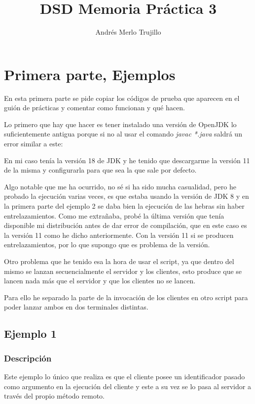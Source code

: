 \documentclass{article}
\title{DSD Memoria Práctica 3}
\author{Andrés Merlo Trujillo}
\date{}
\begin{document}

\maketitle

\section{Primera parte, Ejemplos}
En esta primera parte se pide copiar los códigos de prueba que aparecen en el guión de prácticas y comentar como funcionan y qué hacen.

Lo primero que hay que hacer es tener instalado una versión de OpenJDK lo suficientemente antigua porque si no al usar el comando \textit{javac *.java} saldrá un error similar a este:


En mi caso tenía la versión 18 de JDK y he tenido que descargarme la versión 11 de la misma y configurarla para que sea la que sale por defecto.

Algo notable que me ha ocurrido, no sé si ha sido mucha casualidad, pero he probado la ejecución varias veces, es que estaba usando la versión de JDK 8 y en la primera parte del ejemplo 2 se daba bien la ejecución de las hebras sin haber entrelazamientos. Como me extrañaba, probé la última versión que tenía disponible mi distribución antes de dar error de compilación, que en este caso es la versión 11 como he dicho anteriormente. Con la versión 11 si se producen entrelazamientos, por lo que supongo que es problema de la versión.

Otro problema que he tenido esa la hora de usar el script, ya que dentro del mismo se lanzan secuencialmente el servidor y los clientes, esto produce que se lancen nada más que el servidor y que los clientes no se lancen.

Para ello he separado la parte de la invocación de los clientes en otro script para poder lanzar ambos en dos terminales distintas.

\subsection{Ejemplo 1}
\subsubsection{Descripción}
Este ejemplo lo único que realiza es que el cliente posee un identificador pasado como argumento en la ejecución del cliente y este a su vez se lo pasa al servidor a través del propio método remoto.
\end{document}
